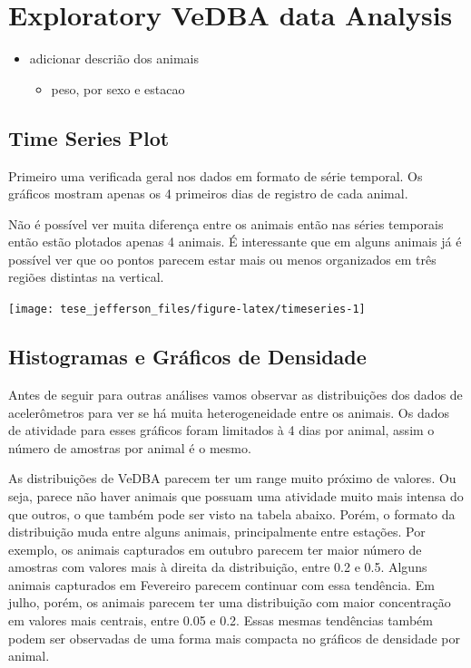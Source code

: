 \documentclass[english,msc,numbers,hidelinks]{coppe}
\providecommand{\tightlist}{%
  \setlength{\itemsep}{0pt}\setlength{\parskip}{0pt}}
\begin{document}
  \hypertarget{exploratory-vedba-data-analysis}{%
  \chapter{Exploratory VeDBA data Analysis}\label{exploratory-vedba-data-analysis}}
  \begin{itemize}
  \tightlist
  \item
    adicionar descrião dos animais
    \begin{itemize}
    \tightlist
    \item
      peso, por sexo e estacao
    \end{itemize}
  \end{itemize}
  \hypertarget{time-series-plot}{%
  \section{Time Series Plot}\label{time-series-plot}}

  Primeiro uma verificada geral nos dados em formato de série temporal. Os gráficos mostram apenas os 4 primeiros dias de registro de cada animal.

  Não é possível ver muita diferença entre os animais então nas séries temporais então estão plotados apenas 4 animais. É interessante que em alguns animais já é possível ver que oo pontos parecem estar mais ou menos organizados em três regiões distintas na vertical.
  \begin{center}\texttt{[image: tese\_jefferson\_files/figure-latex/timeseries-1]} \end{center}

  \newpage

  \hypertarget{histogramas-e-gruxe1ficos-de-densidade}{%
  \section{Histogramas e Gráficos de Densidade}\label{histogramas-e-gruxe1ficos-de-densidade}}

  Antes de seguir para outras análises vamos observar as distribuições dos dados de acelerômetros para ver se há muita heterogeneidade entre os animais. Os dados de atividade para esses gráficos foram limitados à 4 dias por animal, assim o número de amostras por animal é o mesmo.

  As distribuições de VeDBA parecem ter um range muito próximo de valores. Ou seja, parece não haver animais que possuam uma atividade muito mais intensa do que outros, o que também pode ser visto na tabela abaixo. Porém, o formato da distribuição muda entre alguns animais, principalmente entre estações. Por exemplo, os animais capturados em outubro parecem ter maior número de amostras com valores mais à direita da distribuição, entre 0.2 e 0.5. Alguns animais capturados em Fevereiro parecem continuar com essa tendência. Em julho, porém, os animais parecem ter uma distribuição com maior concentração em valores mais centrais, entre 0.05 e 0.2. Essas mesmas tendências também podem ser observadas de uma forma mais compacta no gráficos de densidade por animal.
\end{document}
